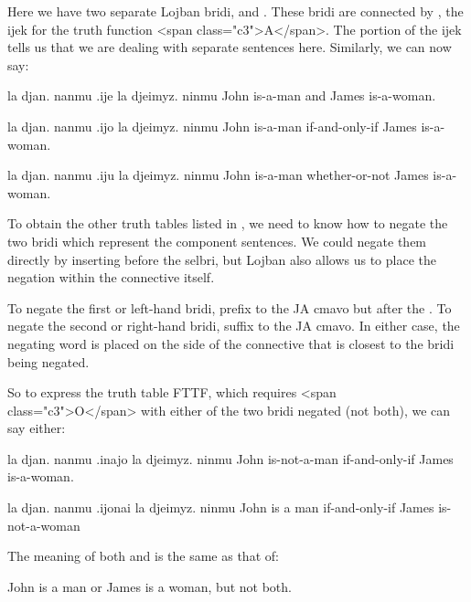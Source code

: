 Here we have two separate Lojban bridi, 
    and . These bridi are connected by
    , the ijek for the truth function <span
    class="c3">A</span>. The  portion of the ijek tells us
    that we are dealing with separate sentences here. Similarly, we
    can now say:
\begin{example}
la djan. nanmu .ije la djeimyz. ninmu\n
John is-a-man and James is-a-woman.
\end{example}

\begin{example}
la djan. nanmu .ijo la djeimyz. ninmu\n
John is-a-man if-and-only-if James is-a-woman.
\end{example}

\begin{example}
la djan. nanmu .iju la djeimyz. ninmu\n
John is-a-man whether-or-not James is-a-woman.
\end{example}

To obtain the other truth tables listed in , we need to know how to negate the two
    bridi which represent the component sentences. We could negate
    them directly by inserting  before the selbri, but Lojban
    also allows us to place the negation within the connective
    itself. 

To negate the first or left-hand bridi, prefix  to the
    JA cmavo but after the . To negate the second or
    right-hand bridi, suffix  to the JA cmavo. In either
    case, the negating word is placed on the side of the connective
    that is closest to the bridi being negated.

So to express the truth table FTTF, which requires <span
    class="c3">O</span> with either of the two bridi negated (not
    both), we can say either:
\begin{example}
la djan. nanmu .inajo la djeimyz. ninmu\n
John is-not-a-man if-and-only-if James is-a-woman.
\end{example}

\begin{example}
la djan. nanmu .ijonai la djeimyz. ninmu\n
John is a man if-and-only-if James is-not-a-woman
\end{example}

The meaning of both  and  is the same as that of:
\begin{example}
John is a man or James is a woman, but not both.
\end{example}

